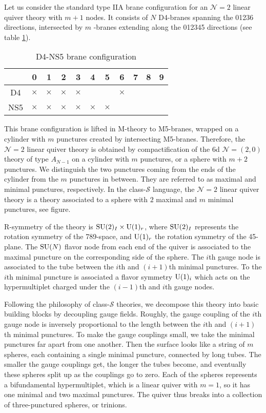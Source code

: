 Let us consider the standard type IIA brane configuration for an $\mathcal{N}=2$
linear quiver theory with $m+1$ nodes. It consists of $N$ D4-branes
spanning the 01236 directions, intersected by $m$ -branes extending
along the 012345 directions (see table \ref{tab:D4NS5}). 
\begin{table}
\caption{D4-NS5 brane configuration}
\label{tab:D4NS5}
\vspace{0.2cm}
  \centering
    \begin{tabular}{|c|c|c|c|c|c|c|c|c|c|c|}
\hline 
  & 0 & 1 & 2 & 3 & 4 & 5 & 6 & 7 & 8 & 9\tabularnewline
\hline 
D4       & $\times$ & $\times$ & $\times$ & $\times$ &    &    &   $\times$ &    &    &  \tabularnewline
\hline 
NS5    & $\times$ & $\times$ & $\times$ & $\times$ & $\times$ & $\times$ &    &    &    &  \tabularnewline
\hline 
    \end{tabular}
\end{table}
This brane configuration is lifted in M-theory to M5-branes, wrapped
on a cylinder with $m$ punctures created by intersecting M5-branes.
Therefore, the $\mathcal{N}=2$ linear quiver theory is obtained by
compactification of the 6d $\mathcal{N}=\left( 2,0 \right)$ theory
of type $A_{N-1}$ on a cylinder with $m$ punctures, or a sphere
with $m+2$ punctures. We distinguish the two punctures coming from
the ends of the cylinder from the $m$ punctures in between. They
are referred to as maximal and minimal punctures, respectively. In
the class-$\mathcal{S}$ language, the $\mathcal{N}=2$ linear quiver
theory is a theory associated to a sphere with $2$ maximal and $m$
minimal punctures, see figure. 

R-symmetry of the theory is $\mathrm{SU}(2)_{I} \times \mathrm{U}(1)_{r}$, where $\mathrm{SU}(2)_{I}$
represents the rotation symmetry of the 789-space, and $\mathrm{U}(1)_{r}$
the rotation symmetry of the 45-plane. The $\mathrm{SU}(N)$ flavor node from
each end of the quiver is associated to the maximal puncture on the
corresponding side of the sphere. The $i$th gauge node is associated
to the tube between the $i$th and $(i+1)$th minimal punctures. To
the $i$th minimal puncture is associated a flavor symmetry $\mathrm{U}(1)_{i}$
which acts on the hypermultiplet charged under the $(i-1)$th and
$i$th gauge nodes. 

Following the philosophy of class-$\mathcal{S}$ theories, we decompose
this theory into basic building blocks by decoupling gauge fields.
Roughly, the gauge coupling of the $i$th gauge node is inversely
proportional to the length between the $i$th and $(i+1)$th minimal
punctures. To make the gauge couplings small, we take the minimal
punctures far apart from one another. Then the surface looks like
a string of $m$ spheres, each containing a single minimal puncture,
connected by long tubes. The smaller the gauge couplings get, the
longer the tubes become, and eventually these spheres split up as
the couplings go to zero. Each of the spheres represents a bifundamental
hypermultiplet, which is a linear quiver with $m=1$, so it has one
minimal and two maximal punctures. The quiver thus breaks into a collection
of three-punctured spheres, or trinions. 

